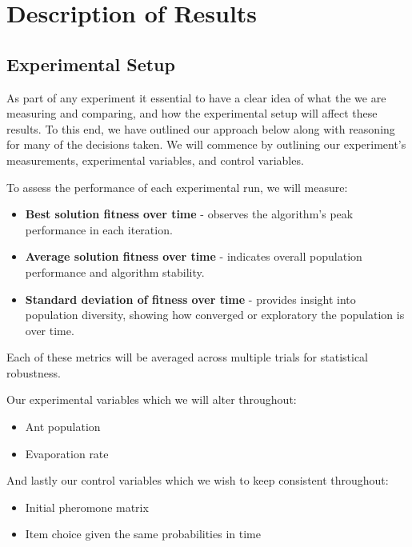 \documentclass[sigconf]{acmart}
\begin{document}
    \section{Description of Results}
        \subsection{Experimental Setup}
            As part of any experiment it essential to have a clear idea of what the we are measuring and comparing, and how the experimental setup will affect these results. To this end, we have outlined our approach below along with reasoning for many of the decisions taken. We will commence by outlining our experiment's measurements, experimental variables, and control variables.\newline

            To assess the performance of each experimental run, we will measure:
            \begin{itemize}
                \item \textbf{Best solution fitness over time} - observes the algorithm’s peak performance in each iteration.
                \item \textbf{Average solution fitness over time} - indicates overall population performance and algorithm stability.
                \item \textbf{Standard deviation of fitness over time} - provides insight into population diversity, showing how converged or exploratory the population is over time.
            \end{itemize}
            
            Each of these metrics will be averaged across multiple trials for statistical robustness.\newline
            
            Our experimental variables which we will alter throughout:
            \begin{itemize}
                \item Ant population
                \item Evaporation rate\newline
            \end{itemize}

            And lastly our control variables which we wish to keep consistent throughout:
            \begin{itemize}
                \item Initial pheromone matrix
                \item Item choice given the same probabilities in time\newline
            \end{itemize}
\end{document}
